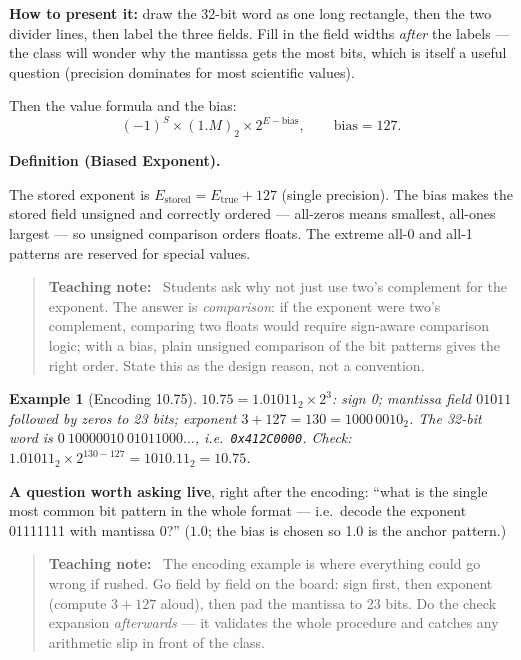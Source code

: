 \documentclass[11pt]{article}
\newtheorem{example}{Example}[section]
\newenvironment{definitionbox}[1]{%
  \par\noindent\textbf{Definition (#1).}\ \itshape
}{\par\vspace{0.3em}}
\newenvironment{teachingaside}{\begin{quote}\small\color{primary-gold}\textbf{Teaching note:}\ }{\end{quote}}
\begin{document}
\textbf{How to present it:} draw the 32-bit word as one long rectangle, then the two divider lines, then label the three fields. Fill in the field widths \emph{after} the labels --- the class will wonder why the mantissa gets the most bits, which is itself a useful question (precision dominates for most scientific values).

Then the value formula and the bias:
\[
  (-1)^S \times (1.M)_2 \times 2^{E-\text{bias}}, \qquad \text{bias} = 127.
\]

\begin{definitionbox}{Biased Exponent}
The stored exponent is $E_{\text{stored}} = E_{\text{true}} + 127$ (single precision). The bias makes the stored field unsigned and correctly ordered --- all-zeros means smallest, all-ones largest --- so unsigned comparison orders floats. The extreme all-0 and all-1 patterns are reserved for special values.
\end{definitionbox}

\begin{teachingaside}
Students ask why not just use two's complement for the exponent. The answer is \emph{comparison}: if the exponent were two's complement, comparing two floats would require sign-aware comparison logic; with a bias, plain unsigned comparison of the bit patterns gives the right order. State this as the design reason, not a convention.
\end{teachingaside}

\begin{example}[Encoding 10.75]
$10.75 = 1.01011_2 \times 2^3$: sign 0; mantissa field $01011$ followed by zeros to 23 bits; exponent $3+127 = 130 = 1000\,0010_2$. The 32-bit word is $0\ 10000010\ 01011000\ldots$, i.e.\ \texttt{0x412C0000}. Check: $1.01011_2 \times 2^{130-127} = 1010.11_2 = 10.75$.
\end{example}

\textbf{A question worth asking live}, right after the encoding: ``what is the single most common bit pattern in the whole format --- i.e.\ decode the exponent 01111111 with mantissa 0?'' ($1.0$; the bias is chosen so 1.0 is the anchor pattern.)

\begin{teachingaside}
The encoding example is where everything could go wrong if rushed. Go field by field on the board: sign first, then exponent (compute $3+127$ aloud), then pad the mantissa to 23 bits. Do the check expansion \emph{afterwards} --- it validates the whole procedure and catches any arithmetic slip in front of the class.
\end{teachingaside}
\end{document}
